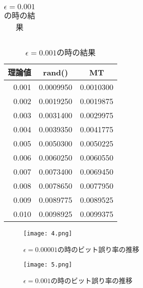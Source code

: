 \documentclass[12pt]{jarticle}
\begin{document}
\begin{table}[h]
\begin{minipage}{0.5\hsize}
\begin{center}
\begin{tabular}{|r|r|r|}
            \end{tabular}
        \end{center}
    \end{minipage}
    \begin{minipage}{0.5\hsize}
        \begin{center}
            \caption{$\epsilon=0.001$の時の結果}
            \begin{tabular}{|r|r|r|} \hline
                \multicolumn{1}{|c|}{理論値} & \multicolumn{1}{|c|}{rand()} & \multicolumn{1}{|c|}{MT} \\\hline
                0.001                        & 0.0009950                    & 0.0010300                \\\hline
                0.002                        & 0.0019250                    & 0.0019875                \\\hline
                0.003                        & 0.0031400                    & 0.0029975                \\\hline
                0.004                        & 0.0039350                    & 0.0041775                \\\hline
                0.005                        & 0.0050300                    & 0.0050225                \\\hline
                0.006                        & 0.0060250                    & 0.0060550                \\\hline
                0.007                        & 0.0073400                    & 0.0069450                \\\hline
                0.008                        & 0.0078650                    & 0.0077950                \\\hline
                0.009                        & 0.0089775                    & 0.0089525                \\\hline
                0.010                        & 0.0098925                    & 0.0099375                \\\hline
            \end{tabular}
        \end{center}
    \end{minipage}
\end{table}
\begin{figure}[H]
    \begin{center}
        \texttt{[image: 4.png]}
    \end{center}
    \caption{$\epsilon=0.00001$の時のビット誤り率の推移}
    \label{fig1}
\end{figure}
\begin{figure}[H]
    \begin{center}
        \texttt{[image: 5.png]}
    \end{center}
    \caption{$\epsilon=0.001$の時のビット誤り率の推移}
    \label{fig1}
\end{figure}
\end{document}
